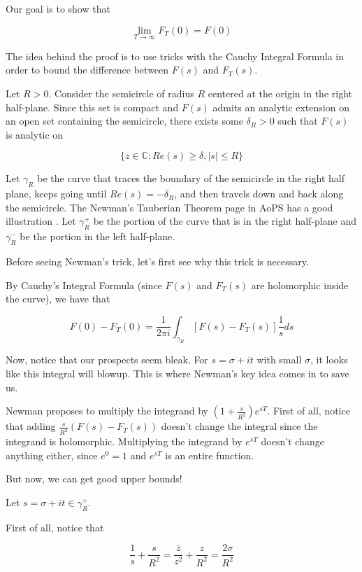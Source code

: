 \documentclass{article}
\theoremstyle{definition}
\newcommand{\C}{\mathbb{C}}
\begin{document}
Our goal is to show that 

\[ \lim_{T \to \infty} F_{T}(0) = F(0) \] 


The idea behind the proof is to use tricks with the Cauchy Integral Formula
in order to bound the difference between $ F(s) $ and $ F_{T}(s) $.

Let $ R > 0 $.
Consider the semicircle of radius $ R $ centered at the origin in the right half-plane.
Since this set is compact and $ F(s) $ admits an analytic extension on an open 
set containing the semicircle, there
exists some $ \delta_{R} > 0 $ such that $ F(s) $ is analytic on 

\[ \{z \in \C : Re(s) \geq \delta, \lvert s \rvert \leq R\} \]

Let $ \gamma_{R} $ be the curve that traces the boundary of the semicircle in the right half plane,
keeps going until $ Re(s) = - \delta_{R} $, and then travels down and back along
the semicircle. The Newman's Tauberian Theorem page in AoPS has a good illustration \cite{noauthor_aops_nodate-1}. Let $ \gamma_{R}^{+} $
be the portion of the curve that is in the right half-plane and $ \gamma_{R}^{-} $ be the portion in the
left half-plane.

Before seeing Newman's trick, let's first see why this trick is necessary.

By Cauchy's Integral Formula (since $ F(s) $ and $ F_{T}(s) $ are holomorphic inside the curve),
we have that 

\[ F(0) - F_{T}(0) = \frac{1}{2 \pi i} \int_{\gamma_{R}} [F(s) - F_{T}(s)] \frac{1}{s} ds \]

Now, notice that our prospects seem bleak. For $ s = \sigma + it $ with small $ \sigma $,
it looks like this integral will blowup. This is where Newman's key idea comes in to save us.

Newman proposes to multiply the integrand by $ (1 + \frac{s}{R^{2}}) e^{sT} $.
First of all, notice that adding $ \frac{s}{R^{2}}(F(s) - F_{T}(s)) $ doesn't change the integral
since the integrand is holomorphic. Multiplying the integrand by $ e^{sT} $ doesn't change anything either,
since $ e^{0} = 1 $ and $ e^{sT} $ is an entire function.

But now, we can get good upper bounds!

Let $ s = \sigma + it  \in \gamma_{R}^{+} $.

First of all, notice that 

\[ \frac{1}{s} + \frac{s}{R^{2}} = \frac{\bar{z}}{z^{2}} + \frac{z}{R^{2}} = \frac{2 \sigma}{R^{2}} \] 
\end{document}
